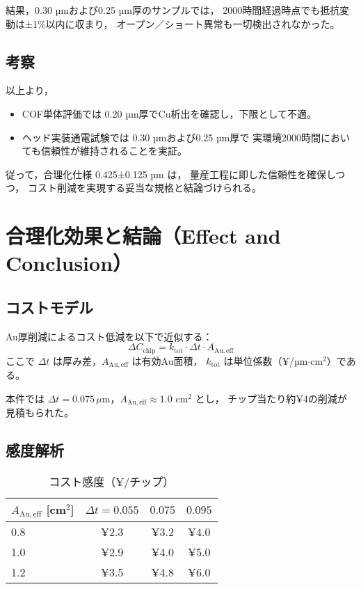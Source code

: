 \documentclass[conference]{IEEEtran}
\begin{document}
結果，0.30 µmおよび0.25 µm厚のサンプルでは，
2000時間経過時点でも抵抗変動は±1\%以内に収まり，
オープン／ショート異常も一切検出されなかった。

\subsection{考察}
以上より，
\begin{itemize}
  \item COF単体評価では 0.20 µm厚でCu析出を確認し，下限として不適。  
  \item ヘッド実装通電試験では 0.30 µmおよび0.25 µm厚で
        実環境2000時間においても信頼性が維持されることを実証。  
\end{itemize}

従って，合理化仕様 0.425±0.125 µm は，
量産工程に即した信頼性を確保しつつ，
コスト削減を実現する妥当な規格と結論づけられる。

\section{合理化効果と結論（Effect and Conclusion）}

\subsection{コストモデル}
Au厚削減によるコスト低減を以下で近似する：
\begin{equation}
  \Delta C_{\mathrm{chip}}
  = k_{\mathrm{tot}} \cdot \Delta t \cdot A_{\mathrm{Au,eff}}
\end{equation}
ここで $\Delta t$ は厚み差，$A_{\mathrm{Au,eff}}$ は有効Au面積，
$k_{\mathrm{tot}}$ は単位係数（¥/µm$\cdot$cm$^2$）である。

本件では $\Delta t=0.075\,\mu$m，$A_{\mathrm{Au,eff}}\approx1.0$ cm$^2$ とし，
チップ当たり約¥4の削減が見積もられた。

\subsection{感度解析}
\begin{table}[htbp]
  \centering
  \caption{コスト感度（¥/チップ）}
  \label{tab:cost-sense}
  \begin{tabular}{@{}lccc@{}}
    \toprule
    $A_{\mathrm{Au,eff}}$ [cm$^2$] & $\Delta t=0.055$ & $0.075$ & $0.095$ \\
    \midrule
    0.8 & ¥2.3 & ¥3.2 & ¥4.0 \\
    1.0 & ¥2.9 & ¥4.0 & ¥5.0 \\
    1.2 & ¥3.5 & ¥4.8 & ¥6.0 \\
    \bottomrule
  \end{tabular}
\end{table}
\end{document}
